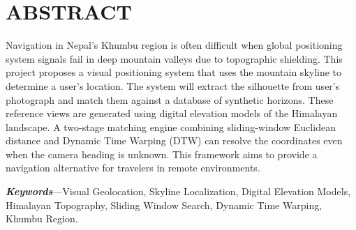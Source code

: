 

\chapter*{ABSTRACT}
{}


\bigskip

Navigation in Nepal's Khumbu region is often difficult when global positioning system signals fail in deep mountain valleys due to topographic shielding. This project proposes a visual positioning system that uses the mountain skyline to determine a user's location. The system will extract the silhouette from user's photograph and match them against a database of synthetic horizons. These reference views are generated using digital elevation models of the Himalayan landscape. A two-stage matching engine combining sliding-window Euclidean distance and Dynamic Time Warping (DTW) can resolve the coordinates even when the camera heading is unknown. This framework aims to provide a navigation alternative for travelers in remote environments.

\vspace{1em}
\noindent\textit{\textbf{Keywords}}---Visual Geolocation, Skyline Localization, Digital Elevation Models, Himalayan Topography, Sliding Window Search, Dynamic Time Warping, Khumbu Region.
